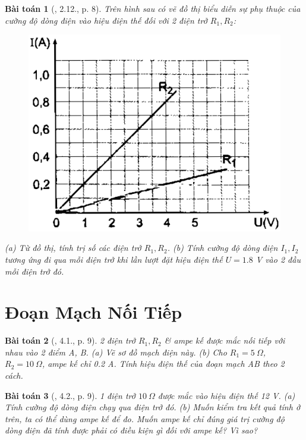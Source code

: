 \documentclass{article}
\newtheorem{baitoan}{Bài toán}
\begin{document}
\begin{baitoan}[\cite{SBT_Vat_Ly_9}, 2.12., p. 8]
	Trên hình sau có vẽ đồ thị biểu diễn sự phụ thuộc của cường độ dòng điện vào hiệu điện thế đối với 2 điện trở $R_1,R_2$:
	\begin{figure}[H]
		\centering
		\includegraphics[scale=0.25]{SBT_2.3}
	\end{figure}
	\noindent(a) Từ đồ thị, tính trị số các điện trở $R_1,R_2$. (b) Tính cường độ dòng điện $I_1,I_2$ tương ứng đi qua mỗi điện trở khi lần lượt đặt hiệu điện thế $U = 1.8$ \emph{V} vào 2 đầu mỗi điện trở đó.
\end{baitoan}


\section{Đoạn Mạch Nối Tiếp}

\begin{baitoan}[\cite{SBT_Vat_Ly_9}, 4.1., p. 9]
	2 điện trở $R_1,R_2$ \& ampe kế được mắc nối tiếp với nhau vào 2 điểm A, B. (a) Vẽ sơ đồ mạch điện này. (b) Cho $R_1 = 5\ \Omega$, $R_2 = 10\ \Omega$, ampe kế chỉ \emph{0.2 A}. Tính hiệu điện thế của đoạn mạch AB theo 2 cách.
\end{baitoan}

\begin{baitoan}[\cite{SBT_Vat_Ly_9}, 4.2., p. 9]
	1 điện trở $10\ \Omega$ được mắc vào hiệu điện thế \emph{12 V}. (a) Tính cường độ dòng điện chạy qua điện trở đó. (b) Muốn kiểm tra kết quả tính ở trên, ta có thể dùng ampe kế để đo. Muốn ampe kế chỉ đúng giá trị cường độ dòng điện đã tính được phải có điều kiện gì đối với ampe kế? Vì sao?
\end{baitoan}
\end{document}
